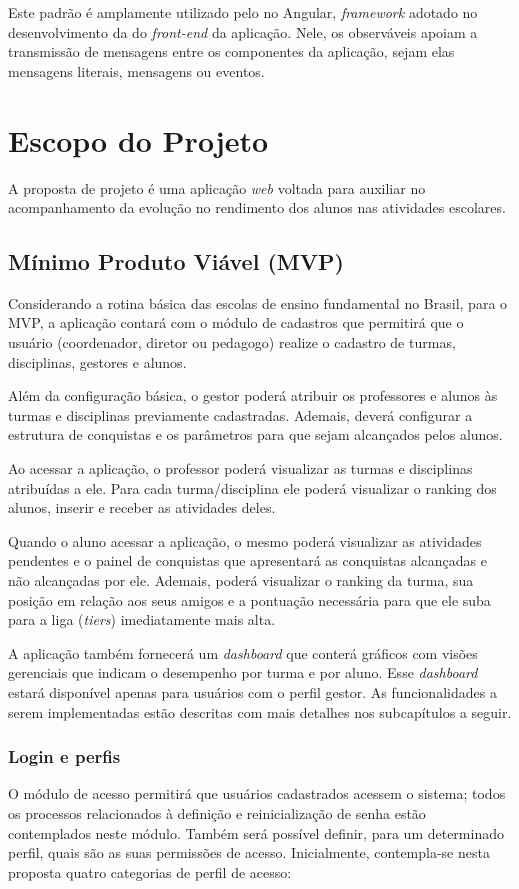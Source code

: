\documentclass[
    12pt,               %
    openright,          %
    oneside,
    a4paper,            %
    paginasA3,  %
    MODELO,             %
    TODO,               %
    english,            %
    brazil              %
    ]{ifsp-spo-inf-ctds} %
\begin{document}
Este padrão é amplamente utilizado pelo no Angular, \textit{framework} adotado no desenvolvimento da do \textit{front-end} da aplicação. Nele, os observáveis apoiam a transmissão de mensagens entre os componentes da aplicação, sejam elas mensagens literais, mensagens ou eventos.

\chapter{Escopo do Projeto}
A proposta de projeto é uma aplicação \textit{web} voltada para auxiliar no acompanhamento da evolução no rendimento dos alunos nas atividades escolares.

\section{Mínimo Produto Viável (MVP)}
Considerando a rotina básica das escolas de ensino fundamental no Brasil, para o MVP, a aplicação contará com o módulo de cadastros que permitirá que o usuário (coordenador, diretor ou pedagogo) realize o cadastro de turmas, disciplinas, gestores e alunos.

Além da configuração básica, o gestor poderá atribuir os professores e alunos às turmas e disciplinas previamente cadastradas. Ademais, deverá configurar a estrutura de conquistas e os parâmetros para que sejam alcançados pelos alunos.

Ao acessar a aplicação, o professor poderá visualizar as turmas e disciplinas atribuídas a ele. Para cada turma/disciplina ele poderá visualizar o ranking dos alunos, inserir e receber as atividades deles.

Quando o aluno acessar a aplicação, o mesmo poderá visualizar as atividades pendentes e o painel de conquistas que apresentará as conquistas alcançadas e não alcançadas por ele. Ademais, poderá visualizar o ranking da turma, sua posição em relação aos seus amigos e a pontuação necessária para que ele suba para a liga (\textit{tiers}) imediatamente mais alta.

A aplicação também fornecerá um \textit{dashboard} que conterá gráficos com visões gerenciais que indicam o desempenho por turma e por aluno. Esse \textit{dashboard} estará disponível apenas para  usuários com o perfil gestor.
As funcionalidades a serem implementadas estão descritas com mais detalhes nos subcapítulos a seguir. 

\subsection{Login e perfis}
O módulo de acesso permitirá que usuários cadastrados acessem o sistema; todos os processos relacionados à definição e reinicialização de senha estão contemplados neste módulo. Também será possível definir, para um determinado perfil, quais são as suas permissões de acesso.
Inicialmente, contempla-se nesta proposta quatro categorias de perfil de acesso: 
\end{document}
